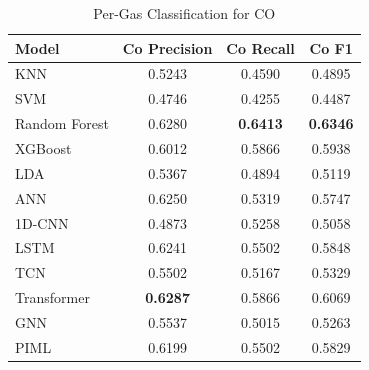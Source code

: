 \begin{table}[htbp]
\centering
\caption{Per-Gas Classification for CO}
\label{tab:CO_detail}
\begin{tabular}{lccc}
\toprule
Model & Co Precision & Co Recall & Co F1 \\
\midrule
KNN & 0.5243 & 0.4590 & 0.4895 \\
SVM & 0.4746 & 0.4255 & 0.4487 \\
Random Forest & 0.6280 & \textbf{0.6413} & \textbf{0.6346} \\
XGBoost & 0.6012 & 0.5866 & 0.5938 \\
LDA & 0.5367 & 0.4894 & 0.5119 \\
ANN & 0.6250 & 0.5319 & 0.5747 \\
1D-CNN & 0.4873 & 0.5258 & 0.5058 \\
LSTM & 0.6241 & 0.5502 & 0.5848 \\
TCN & 0.5502 & 0.5167 & 0.5329 \\
Transformer & \textbf{0.6287} & 0.5866 & 0.6069 \\
GNN & 0.5537 & 0.5015 & 0.5263 \\
PIML & 0.6199 & 0.5502 & 0.5829 \\
\bottomrule
\end{tabular}
\end{table}